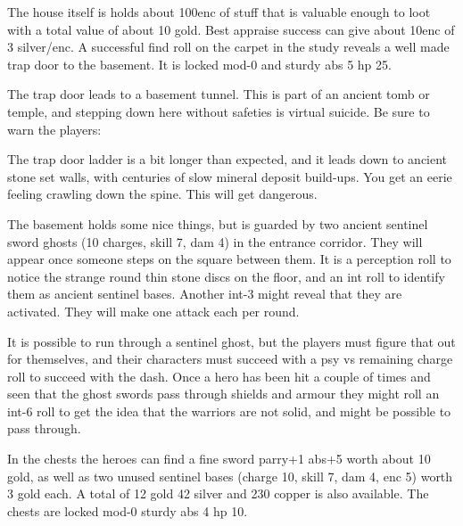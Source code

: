 The house itself is holds about 100enc of stuff that is valuable enough to loot with a total value of about 10 gold. Best appraise success can give about 10enc of 3 silver/enc.
A successful find roll on the carpet in the study reveals a well made trap door to the basement. It is locked mod-0 and sturdy abs 5 hp 25.

The trap door leads to a basement tunnel. This is part of an ancient tomb or temple, and stepping down here without safeties is virtual suicide. Be sure to warn the players:
\begin{readoutloud}
The trap door ladder is a bit longer than expected, and it leads down to ancient stone set walls, with centuries of slow mineral deposit build-ups. You get an eerie feeling crawling down the spine. This will get dangerous.
\end{readoutloud}

The basement holds some nice things, but is guarded by two ancient sentinel sword ghosts (10 charges, skill 7, dam 4) in the entrance corridor. They will appear once someone steps on the square between them.
It is a perception roll to notice the strange round thin stone discs on the floor, and an int roll to identify them as ancient sentinel bases. Another int-3 might reveal that they are activated. They will make one attack each per round.

It is possible to run through a sentinel ghost, but the players must figure that out for themselves, and their characters must succeed with a psy vs remaining charge roll to succeed with the dash. Once a hero has been hit a couple of times and seen that the ghost swords pass through shields and armour they might roll an int-6 roll to get the idea that the warriors are not solid, and might be possible to pass through.

In the chests the heroes can find a fine sword parry+1 abs+5 worth about 10 gold, as well as two unused sentinel bases (charge 10, skill 7, dam 4, enc 5) worth 3 gold each. A total of 12 gold 42 silver and 230 copper is also available. The chests are locked mod-0 sturdy abs 4 hp 10.


%

%

